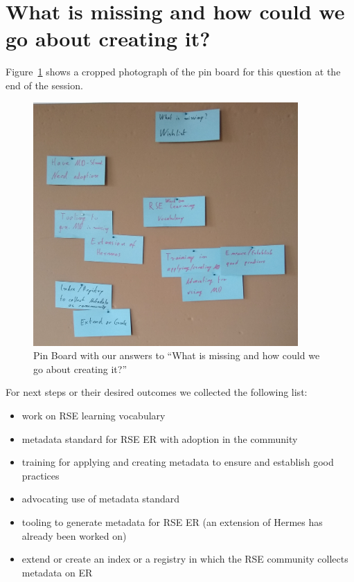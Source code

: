 \documentclass{scrartcl}
\begin{document}
\section*{What is missing and how could we go about creating it?}

Figure~\ref{fig:future} shows a cropped photograph of the pin board for this question at the end of the session.

\begin{figure}[h]
  \centering
  \includegraphics[width=0.9\textwidth]{future}
  \caption{Pin Board with our answers to “What is missing and how could we go about creating it?”}\label{fig:future}
\end{figure}

For next steps or their desired outcomes we collected the following list:
\begin{itemize}
\item work on RSE learning vocabulary
\item metadata standard for RSE ER with adoption in the community
\item training for applying and creating metadata to ensure and establish good practices
\item advocating use of metadata standard
\item tooling to generate metadata for RSE ER (an extension of Hermes\cite{Meinel_hermes} has already been worked on)
\item extend or create an index or a registry in which the RSE community collects metadata on ER
\end{itemize}

\printbibliography
\end{document}
